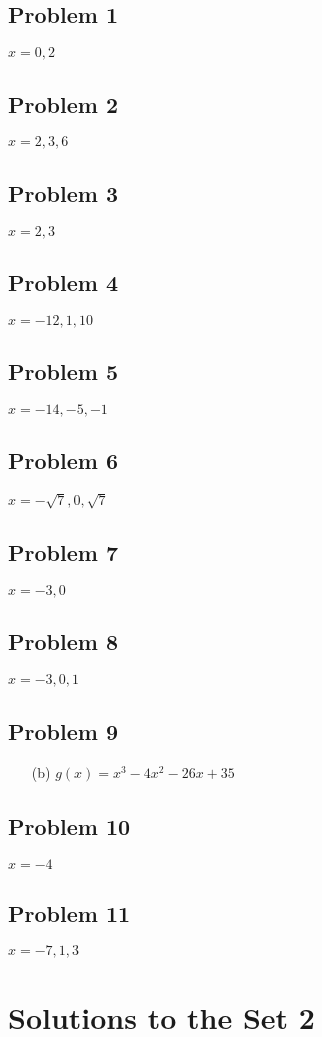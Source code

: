 \documentclass[12pt]{article}
\begin{document}
\subsection*{Problem 1}
\(x=0,2\)
\subsection*{Problem 2}
\(x=2,3,6\)
\subsection*{Problem 3}
\(x=2,3\)
\subsection*{Problem 4}
\(x=-12,1,10\)
\subsection*{Problem 5}
\(x=-14,-5,-1\)
\subsection*{Problem 6}
\(x=-\sqrt{7},0,\sqrt{7}\)
\subsection*{Problem 7}
\(x=-3,0\)
\subsection*{Problem 8}
\(x=-3,0,1\)
\subsection*{Problem 9}
\begin{enumerate}
    \item[(b)] \(g(x)=x^3-4x^2-26x+35\) 
\end{enumerate}
\subsection*{Problem 10}
\(x=-4\)
\subsection*{Problem 11}
\(x=-7,1,3\)

\section*{Solutions to the Set 2}
\end{document}
